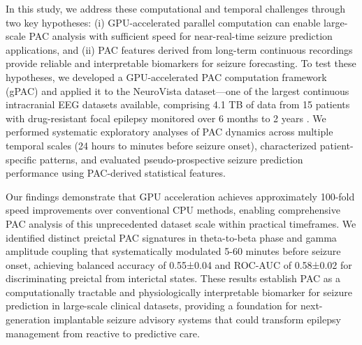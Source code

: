 In this study, we address these computational and temporal challenges through two key hypotheses: (i) GPU-accelerated parallel computation can enable large-scale PAC analysis with sufficient speed for near-real-time seizure prediction applications, and (ii) PAC features derived from long-term continuous recordings provide reliable and interpretable biomarkers for seizure forecasting. To test these hypotheses, we developed a GPU-accelerated PAC computation framework (gPAC) and applied it to the NeuroVista dataset—one of the largest continuous intracranial EEG datasets available, comprising 4.1 TB of data from 15 patients with drug-resistant focal epilepsy monitored over 6 months to 2 years \cite{Kuhlmann2018SeizurePA}. We performed systematic exploratory analyses of PAC dynamics across multiple temporal scales (24 hours to minutes before seizure onset), characterized patient-specific patterns, and evaluated pseudo-prospective seizure prediction performance using PAC-derived statistical features.

Our findings demonstrate that GPU acceleration achieves approximately 100-fold speed improvements over conventional CPU methods, enabling comprehensive PAC analysis of this unprecedented dataset scale within practical timeframes. We identified distinct preictal PAC signatures in theta-to-beta phase and gamma amplitude coupling that systematically modulated 5-60 minutes before seizure onset, achieving balanced accuracy of 0.55±0.04 and ROC-AUC of 0.58±0.02 for discriminating preictal from interictal states. These results establish PAC as a computationally tractable and physiologically interpretable biomarker for seizure prediction in large-scale clinical datasets, providing a foundation for next-generation implantable seizure advisory systems that could transform epilepsy management from reactive to predictive care.

\label{sec:introduction}

